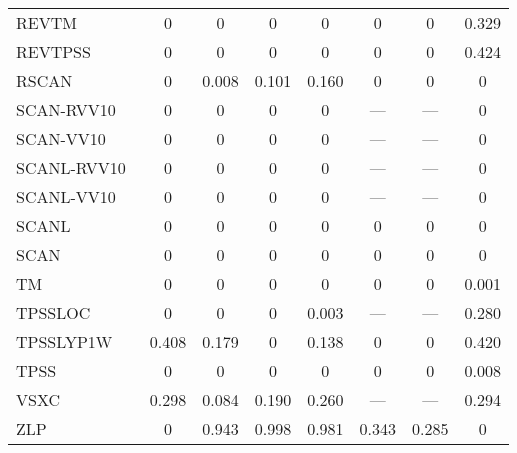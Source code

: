 \begin{table*}
\begin{tabular}{|l|c|c|c|c|c|c|c|}
REVTM~\cite{Jana2019_6356} & 0 & 0 & 0 & 0 & 0 & 0 & 0.329 \\
REVTPSS~\cite{Perdew2009_026403,Perdew2009_026403_err} & 0 & 0 & 0 & 0 & 0 & 0 & 0.424 \\
RSCAN~\cite{Bartok2019_161101} & 0 & 0.008 & 0.101 & 0.160 & 0 & 0 & 0 \\
SCAN-RVV10~\cite{Peng2016_041005} & 0 & 0 & 0 & 0 & --- & --- & 0 \\
SCAN-VV10~\cite{Brandenburg2016_115144} & 0 & 0 & 0 & 0 & --- & --- & 0 \\
SCANL-RVV10~\cite{Mejia2017_052512,Mejia2018_115161,Peng2016_041005} & 0 & 0 & 0 & 0 & --- & --- & 0 \\
SCANL-VV10~\cite{Mejia2017_052512,Mejia2018_115161,Brandenburg2016_115144} & 0 & 0 & 0 & 0 & --- & --- & 0 \\
SCANL~\cite{Mejia2017_052512,Mejia2018_115161,Sun2015_036402} & 0 & 0 & 0 & 0 & 0 & 0 & 0 \\
SCAN~\cite{Sun2015_036402} & 0 & 0 & 0 & 0 & 0 & 0 & 0 \\
TM~\cite{Tao2016_073001} & 0 & 0 & 0 & 0 & 0 & 0 & 0.001 \\
TPSSLOC~\cite{Constantin2012_035130} & 0 & 0 & 0 & 0.003 & --- & --- & 0.280 \\
TPSSLYP1W~\cite{Dahlke2005_15677} & 0.408 & 0.179 & 0 & 0.138 & 0 & 0 & 0.420 \\
TPSS~\cite{Tao2003_146401,Perdew2004_6898} & 0 & 0 & 0 & 0 & 0 & 0 & 0.008 \\
VSXC~\cite{VanVoorhis1998_400} & 0.298 & 0.084 & 0.190 & 0.260 & --- & --- & 0.294 \\
ZLP~\cite{Zhao1993_918} & 0 & 0.943 & 0.998 & 0.981 & 0.343 & 0.285 & 0 \\
\bottomrule
\end{tabular}
\end{table*}
